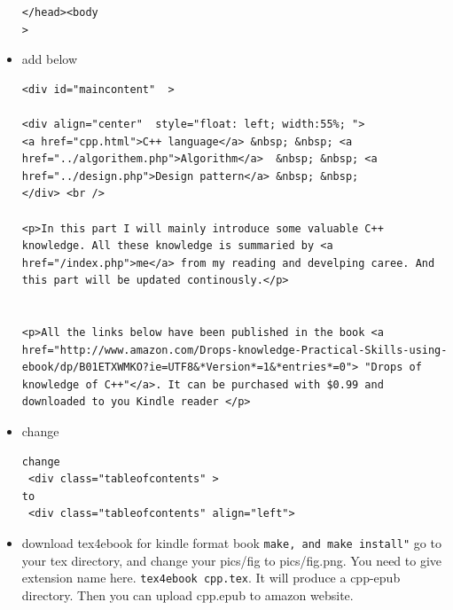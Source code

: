 \documentclass[a4paper,12pt,twoside]{book}
\begin{document}
\begin{itemize}
\begin{verbatim}
</head><body 
>
\end{verbatim}

\item add below 

\begin{verbatim}
<div id="maincontent"  >

<div align="center"  style="float: left; width:55%; ">
<a href="cpp.html">C++ language</a> &nbsp; &nbsp; <a href="../algorithem.php">Algorithm</a>  &nbsp; &nbsp; <a href="../design.php">Design pattern</a> &nbsp; &nbsp;
</div> <br />

<p>In this part I will mainly introduce some valuable C++ knowledge. All these knowledge is summaried by <a href="/index.php">me</a> from my reading and develping caree. And this part will be updated continously.</p>


<p>All the links below have been published in the book <a href="http://www.amazon.com/Drops-knowledge-Practical-Skills-using-ebook/dp/B01ETXWMKO?ie=UTF8&*Version*=1&*entries*=0"> "Drops of knowledge of C++"</a>. It can be purchased with $0.99 and downloaded to you Kindle reader </p> 

\end{verbatim}

\item change 

\begin{verbatim}
change
 <div class="tableofcontents" >
to
 <div class="tableofcontents" align="left">
\end{verbatim}





\item download tex4ebook for kindle format book
\verb=make, and make install"=
go to your tex directory, and change your pics/fig to pics/fig.png. You need to give extension name here.
\verb=tex4ebook cpp.tex=. It will produce a cpp-epub directory. Then you can upload cpp.epub to amazon website.


		
\end{itemize}
\end{document}
